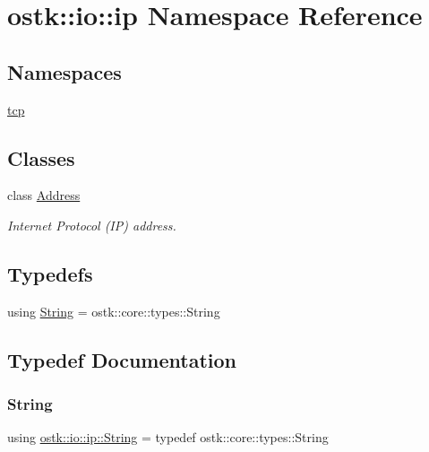 \hypertarget{namespaceostk_1_1io_1_1ip}{}\section{ostk\+:\+:io\+:\+:ip Namespace Reference}
\label{namespaceostk_1_1io_1_1ip}
\subsection*{Namespaces}
\begin{DoxyCompactItemize}
\item 
 \hyperlink{namespaceostk_1_1io_1_1ip_1_1tcp}{tcp}
\end{DoxyCompactItemize}
\subsection*{Classes}
\begin{DoxyCompactItemize}
\item 
class \hyperlink{classostk_1_1io_1_1ip_1_1_address}{Address}
\begin{DoxyCompactList}\small\item\em Internet Protocol (IP) address. \end{DoxyCompactList}\end{DoxyCompactItemize}
\subsection*{Typedefs}
\begin{DoxyCompactItemize}
\item 
using \hyperlink{namespaceostk_1_1io_1_1ip_a987b35b1bc61a18b66c2a45f9ce5536e}{String} = ostk\+::core\+::types\+::\+String
\end{DoxyCompactItemize}


\subsection{Typedef Documentation}
\mbox{\label{namespaceostk_1_1io_1_1ip_a987b35b1bc61a18b66c2a45f9ce5536e}} 
\subsubsection{\texorpdfstring{String}{String}}
{\footnotesize\ttfamily using \hyperlink{namespaceostk_1_1io_1_1ip_a987b35b1bc61a18b66c2a45f9ce5536e}{ostk\+::io\+::ip\+::\+String} = typedef ostk\+::core\+::types\+::\+String}

